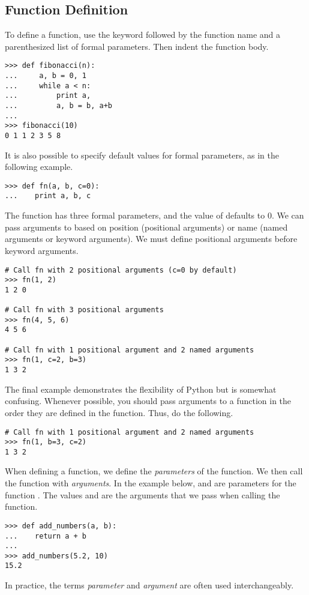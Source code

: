\subsection*{Function Definition}
\begin{example}
To define a function, use the  keyword followed by the function name and a parenthesized list of formal parameters. Then indent the function body.
\begin{lstlisting}
>>> def fibonacci(n):
...     a, b = 0, 1
...     while a < n:
...         print a,
...         a, b = b, a+b
...         
>>> fibonacci(10)
0 1 1 2 3 5 8
\end{lstlisting}

It is also possible to specify default values for formal parameters, as in the following example.
\begin{lstlisting}
>>> def fn(a, b, c=0):
...    print a, b, c
\end{lstlisting}
The function  has three formal parameters, and the value of  defaults to 0.
We can pass arguments to  based on position (positional arguments) or name (named arguments or keyword arguments). We must define positional arguments before keyword arguments.
\begin{lstlisting}
# Call fn with 2 positional arguments (c=0 by default)
>>> fn(1, 2)
1 2 0

# Call fn with 3 positional arguments
>>> fn(4, 5, 6)
4 5 6

# Call fn with 1 positional argument and 2 named arguments
>>> fn(1, c=2, b=3)
1 3 2
\end{lstlisting}
The final example demonstrates the flexibility of Python but is somewhat confusing. Whenever possible, you should pass arguments to a function in the order they are defined in the function. Thus, do the following.
\begin{lstlisting}
# Call fn with 1 positional argument and 2 named arguments
>>> fn(1, b=3, c=2)
1 3 2
\end{lstlisting}

\begin{info}
When defining a function, we define the \emph{parameters} of the function.  We then call the function with \emph{arguments}.
In the example below,  and  are parameters for the function .
The values  and  are the arguments that we pass when calling the function.

\begin{lstlisting}
>>> def add_numbers(a, b):
...    return a + b
...
>>> add_numbers(5.2, 10)
15.2
\end{lstlisting}
In practice, the terms \emph{parameter} and \emph{argument} are often used interchangeably.
\end{info}


\end{example}
